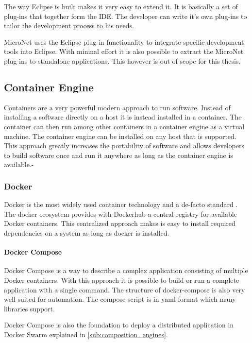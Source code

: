 The way Eclipse is built makes it very easy to extend it. It is basically a set
of plug-ins that together form the IDE. The developer can write it's own
plug-ins to tailor the development process to his needs. 

MicroNet uses the Eclipse plug-in functionality to integrate \ms{} specific
development tools into Eclipse. With mininal effort it is also possible to
extract the MicroNet plug-ins to standalone applications. This however is out of
scope for this thesis.

\subsection{Container Engine}

Containers are a very powerful modern approach to run software. Instead of
installing a software directly on a host it is instead installed in a container.
The container can then run among other containers in a container engine as a
virtual machine. The container engine can be installed on any host that is
supported. This approach greatly increases the portability of software and
allows developers to build software once and run it anywhere as long as the
container engine is available.-

\subsubsection{Docker}

Docker is the most widely used container technology and a de-facto standard
. The docker ecosystem provides with Dockerhub a central
registry for available Docker containers. This centralized approach makes is
easy to install required dependencies on a system as long as docker is
installed.

\paragraph{Docker Compose}

Docker Compose is a way to describe a complex application consisting of multiple
Docker containers. With this approach it is possible to build or run a complete
\ms{} application with a single command. The structure of docker-compose is
also very well suited for automation. The compose script is in yaml format which
many libraries support.

Docker Compose is also the foundation to deploy a distributed application in
Docker Swarm explained in \autoref{sub:composition_engines}.

